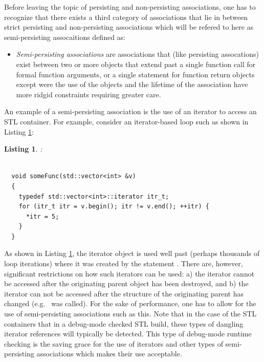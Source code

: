 \documentclass[pdf,ps2pdf,11pt]{SANDreport}
\newtheorem{listing}{Listing}
\begin{document}
Before leaving the topic of persisting and non-persisting
associations, one has to recognize that there exists a third category
of associations that lie in between strict persisting and
non-persisting associations which will be refered to here as
semi-persisting assocaitions defined as:

\begin{itemize}

{}\item\textit{Semi-persisting associations} are associations that
(like persisting assocations) exist between two or more objects that
extend past a single function call for formal function arguments, or a
single statement for function return objects except were the use of
the objects and the lifetime of the association have more ridgid
constraints requiring greater care.

\end{itemize}

An example of a semi-persisting association is the use of an iterator
to access an STL container.  For example, consider an iterator-based
loop such as shown in Listing {}\ref{listing:SemiPersistingIterators}:


\begin{listing}:\\
\label{listing:SemiPersistingIterators}
{\small\begin{verbatim}

  void someFunc(std::vector<int> &v)
  {
    typedef std::vector<int>::iterator itr_t;
    for (itr_t itr = v.begin(); itr != v.end(); ++itr) {
      *itr = 5;
    }
  }
\end{verbatim}}
\end{listing}


As shown in Listing {}\ref{listing:SemiPersistingIterators}, the
iterator object {} is used well past (perhaps thousands of
loop iterations) where it was created by the statement {}.  There are, however, significant restrictions on how
such iterators can be used: a) the iterator cannot be accessed after
the originating parent object has been destroyed, and b) the iterator
can not be accessed after the structure of the originating parent has
changed (e.g.\ {} was called).  For the sake of
performance, one has to allow for the use of semi-persisting
associations such as this.  Note that in the case of the STL
containers that in a debug-mode checked STL build, these types of
dangling iterator references will typically be detected.  This type of
debug-mode runtime checking is the saving grace for the use of
iterators and other types of semi-persisting associations which makes
their use acceptable.
\end{document}
